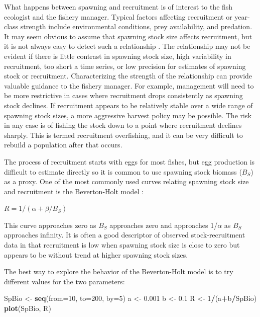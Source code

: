 \documentclass[
]{krantz}
\makeatletter
\newenvironment{Shaded}{\begin{snugshade}}{\end{snugshade}}
\newcommand{\AttributeTok}[1]{\textcolor[rgb]{0.27,0.27,0.27}{#1}}
\newcommand{\DecValTok}[1]{\textcolor[rgb]{0.06,0.06,0.06}{#1}}
\newcommand{\FloatTok}[1]{\textcolor[rgb]{0.06,0.06,0.06}{#1}}
\newcommand{\FunctionTok}[1]{\textcolor[rgb]{0.27,0.27,0.27}{\textbf{#1}}}
\newcommand{\NormalTok}[1]{#1}
\newcommand{\OtherTok}[1]{\textcolor[rgb]{0.37,0.37,0.37}{#1}}
\newcommand{\SpecialCharTok}[1]{\textcolor[rgb]{0.43,0.43,0.43}{\textbf{#1}}}
\newenvironment{kframe}{%
\medskip{}
\setlength{\fboxsep}{.8em}
 \def\at@end@of@kframe{}%
 \ifinner\ifhmode%
  \def\at@end@of@kframe{\end{minipage}}%
  \begin{minipage}{\columnwidth}%
 \fi\fi%
 \def\FrameCommand##1{\hskip\@totalleftmargin \hskip-\fboxsep
 \colorbox{shadecolor}{##1}\hskip-\fboxsep
     \hskip-\linewidth \hskip-\@totalleftmargin \hskip\columnwidth}%
 \MakeFramed {\advance\hsize-\width
   \@totalleftmargin\z@ \linewidth\hsize
   \@setminipage}}%
 {\par\unskip\endMakeFramed%
 \at@end@of@kframe}
\renewenvironment{Shaded}{\begin{kframe}}{\end{kframe}}
\makeatother
\begin{document}
What happens between spawning and recruitment is of interest to the fish ecologist and the fishery manager. Typical factors affecting recruitment or year-class strength include environmental conditions, prey availability, and predation. It may seem obvious to assume that spawning stock size affects recruitment, but it is not always easy to detect such a relationship \citep{hilborn.walters_1992}. The relationship may not be evident if there is little contrast in spawning stock size, high variability in recruitment, too short a time series, or low precision for estimates of spawning stock or recruitment. Characterizing the strength of the relationship can provide valuable guidance to the fishery manager. For example, management will need to be more restrictive in cases where recruitment drops consistently as spawning stock declines. If recruitment appears to be relatively stable over a wide range of spawning stock sizes, a more aggressive harvest policy may be possible. The risk in any case is of fishing the stock down to a point where recruitment declines sharply. This is termed recruitment overfishing, and it can be very difficult to rebuild a population after that occurs.

The process of recruitment starts with eggs for most fishes, but egg production is difficult to estimate directly so it is common to use spawning stock biomass (\(B_S\)) as a proxy. One of the most commonly used curves relating spawning stock size and recruitment is the Beverton-Holt model \citep{beverton.holt_1993}:

\(R=1/(\alpha +\beta/B_S)\)

This curve approaches zero as \(B_S\) approaches zero and approaches 1/\(\alpha\) as \(B_S\) approaches infinity. It is often a good descriptor of observed stock-recruitment data in that recruitment is low when spawning stock size is close to zero but appears to be without trend at higher spawning stock sizes.

The best way to explore the behavior of the Beverton-Holt model is to try different values for the two parameters:

\begin{Shaded}
\begin{Highlighting}[]
\NormalTok{SpBio }\OtherTok{\textless{}{-}} \FunctionTok{seq}\NormalTok{(}\AttributeTok{from=}\DecValTok{10}\NormalTok{, }\AttributeTok{to=}\DecValTok{200}\NormalTok{, }\AttributeTok{by=}\DecValTok{5}\NormalTok{)}
\NormalTok{a }\OtherTok{\textless{}{-}} \FloatTok{0.001}
\NormalTok{b }\OtherTok{\textless{}{-}} \FloatTok{0.1}
\NormalTok{R }\OtherTok{\textless{}{-}} \DecValTok{1}\SpecialCharTok{/}\NormalTok{(a}\SpecialCharTok{+}\NormalTok{b}\SpecialCharTok{/}\NormalTok{SpBio)}
\FunctionTok{plot}\NormalTok{(SpBio, R)}
\end{Highlighting}
\end{Shaded}
\end{document}
